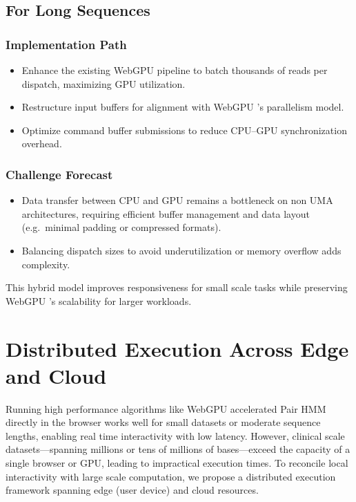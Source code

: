 \documentclass[PhD]{PHlab-thesis}
\begin{document}
\subsection{For Long Sequences}

\subsubsection*{Implementation Path}
\begin{itemize}
  \item Enhance the existing WebGPU pipeline to batch thousands of reads per dispatch, maximizing GPU utilization.
  \item Restructure input buffers for alignment with WebGPU 's parallelism model.
  \item Optimize command buffer submissions to reduce CPU–GPU synchronization overhead.
\end{itemize}

\subsubsection*{Challenge Forecast}
\begin{itemize}
  \item Data transfer between CPU and GPU remains a bottleneck on non UMA architectures, requiring efficient buffer management and data layout (e.g.\ minimal padding or compressed formats).
  \item Balancing dispatch sizes to avoid underutilization or memory overflow adds complexity.
\end{itemize}

This hybrid model improves responsiveness for small scale tasks while preserving WebGPU 's scalability for larger workloads.

\section{Distributed Execution Across Edge and Cloud}

Running high performance algorithms like WebGPU accelerated Pair HMM directly in the browser works well for small datasets or moderate sequence lengths, enabling real time interactivity with low latency. However, clinical scale datasets—spanning millions or tens of millions of bases—exceed the capacity of a single browser or GPU, leading to impractical execution times. To reconcile local interactivity with large scale computation, we propose a distributed execution framework spanning edge (user device) and cloud resources.
\end{document}

